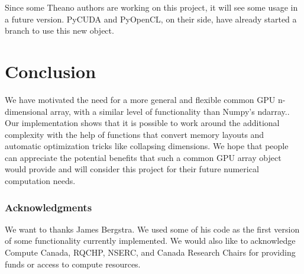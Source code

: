 \documentclass{article} %
\begin{document}
Since some Theano authors are working on this project, it will see some usage in a future version. PyCUDA and PyOpenCL, on their side, have already started a branch to use this new object.

\section{Conclusion}

We have motivated the need for a more general and flexible common GPU n-dimensional array, with a similar level of functionality than Numpy's ndarray..
Our implementation shows that it is possible to work around the additional complexity with the help of functions that convert memory layouts and automatic optimization tricks like collapsing dimensions.
We hope that people can appreciate the potential benefits that such a common GPU array object would provide and will consider this project for their future numerical computation needs.

\subsubsection*{Acknowledgments}

We want to thanks James Bergstra. We used some of his code as the first version of some functionality currently implemented. We would also like to acknowledge Compute Canada, RQCHP, NSERC, and Canada Research Chairs for providing funds or access to compute resources.




\end{document}
